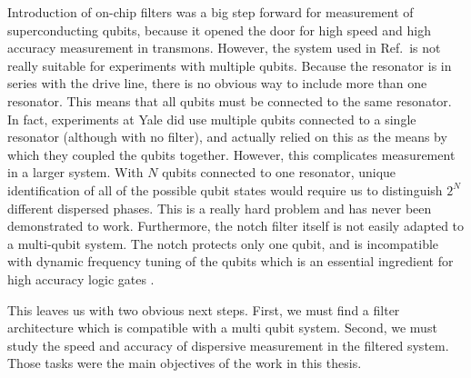Introduction of on-chip filters was a big step forward for measurement of superconducting qubits, because it opened the door for high speed and high accuracy measurement in transmons.
However, the system used in Ref.\,\cite{Reed:filter2010} is not really suitable for experiments with multiple qubits.
Because the resonator is in series with the drive line, there is no obvious way to include more than one resonator.
This means that all qubits must be connected to the same resonator.
In fact, experiments at Yale did use multiple qubits connected to a single resonator (although with no filter), and actually relied on this as the means by which they coupled the qubits together.
However, this complicates measurement in a larger system.
With $N$ qubits connected to one resonator, unique identification of all of the possible qubit states would require us to distinguish $2^N$ different dispersed phases.
This is a really hard problem and has never been demonstrated to work. Furthermore, the notch filter itself is not easily adapted to a multi-qubit system.
The notch protects only one qubit, and is incompatible with dynamic frequency tuning of the qubits which is an essential ingredient for high accuracy logic gates \cite{Barends:gates2014}.

This leaves us with two obvious next steps. First, we must find a filter architecture which is compatible with a multi qubit system. Second, we must study the speed and accuracy of dispersive measurement in the filtered system. Those tasks were the main objectives of the work in this thesis.
